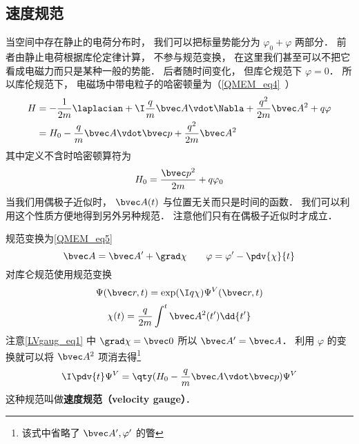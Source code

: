 
\begin{issues}
\issueDraft
\end{issues}


\subsection{速度规范}
当空间中存在静止的电荷分布时， 我们可以把标量势能分为 $\varphi_0 + \varphi$ 两部分． 前者由静止电荷根据库伦定律计算， 不参与规范变换， 在这里我们甚至可以不把它看成电磁力而只是某种一般的势能． 后者随时间变化， 但库仑规范下 $\varphi = 0$． 所以库伦规范下， 电磁场中带电粒子的哈密顿量为（\autoref{QMEM_eq4}~）
\begin{equation}
\begin{aligned}
H &= -\frac{1}{2m} \laplacian + \I \frac{q}{m} \bvec A \vdot \Nabla + \frac{q^2}{2m} \bvec A^2 + q\varphi\\
&= H_0 - \frac{q}{m} \bvec A \vdot \bvec p + \frac{q^2}{2m} \bvec A^2
\end{aligned}
\end{equation}
其中定义不含时哈密顿算符为
\begin{equation}
H_0 = \frac{\bvec p^2}{2m} + q\varphi_0
\end{equation}
当我们用偶极子近似时， $\bvec A(t)$ 与位置无关而只是时间的函数． 我们可以利用这个性质方便地得到另外另种规范． 注意他们只有在偶极子近似时才成立．

规范变换为\autoref{QMEM_eq5}~
\begin{equation}\label{LVgaug_eq1}
\bvec A = \bvec A' + \grad \chi
\qquad
\varphi = \varphi' - \pdv{\chi}{t}
\end{equation}
对库仑规范使用规范变换
\begin{equation}\label{LVgaug_eq3}
\Psi(\bvec r, t) = \exp(\I q\chi)\Psi^V(\bvec r, t)
\end{equation}
\begin{equation}\label{LVgaug_eq4}
\chi(t) = \frac{q}{2m} \int^t \bvec A^2(t') \dd{t'}
\end{equation}
注意\autoref{LVgaug_eq1} 中 $\grad \chi = \bvec 0$ 所以 $\bvec A' = \bvec A$． 利用 $\varphi$ 的变换就可以将 $\bvec A^2$ 项消去得\footnote{该式中省略了 $\bvec A', \varphi'$ 的瞥}
\begin{equation}
\I \pdv{t} \Psi^V = \qty(H_0 - \frac{q}{m} \bvec A \vdot \bvec p) \Psi^V
\end{equation}
这种规范叫做\textbf{速度规范（velocity gauge）}．

